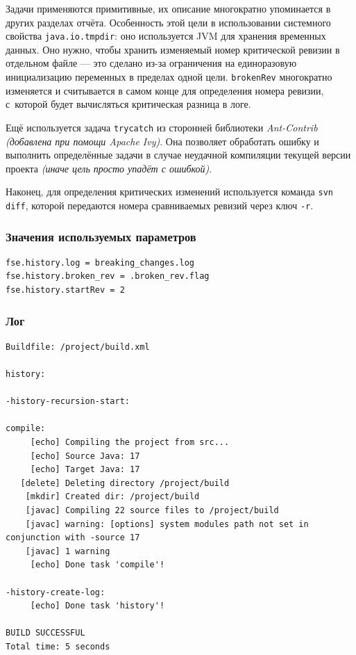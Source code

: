 Задачи применяются примитивные, их описание многократно упоминается в других разделах отчёта. Особенность этой цели в использовании системного свойства \texttt{java.io.tmpdir}: оно используется JVM для хранения временных данных. Оно нужно, чтобы хранить изменяемый номер критической ревизии в отдельном файле --- это сделано из-за ограничения на единоразовую инициализацию переменных в пределах одной цели. \texttt{brokenRev} многократно изменяется и считывается в самом конце для определения номера ревизии, с~которой будет вычисляться критическая разница в логе.

Ещё используется задача \texttt{trycatch} из сторонней библиотеки \textit{Ant-Contrib} \textit{(добавлена при помощи Apache Ivy)}. Она позволяет обработать ошибку и выполнить определённые задачи в случае неудачной компиляции текущей версии проекта \textit{(иначе цель просто упадёт с ошибкой)}.

Наконец, для определения критических изменений используется команда \texttt{svn diff}, которой передаются номера сравниваемых ревизий через ключ \texttt{-r}.

\subsubsection{Значения используемых параметров}

\begin{lstlisting}[language=Properties,caption={Часть содержимого файла \texttt{build.properties}},captionpos=b]
fse.history.log = breaking_changes.log
fse.history.broken_rev = .broken_rev.flag
fse.history.startRev = 2
\end{lstlisting}

\subsubsection{Лог}

\begin{lstlisting}[caption={Лог цели \texttt{history} --- нет ошибок},language={},captionpos=b]
Buildfile: /project/build.xml

history:

-history-recursion-start:

compile:
     [echo] Compiling the project from src...
     [echo] Source Java: 17
     [echo] Target Java: 17
   [delete] Deleting directory /project/build
    [mkdir] Created dir: /project/build
    [javac] Compiling 22 source files to /project/build
    [javac] warning: [options] system modules path not set in conjunction with -source 17
    [javac] 1 warning
     [echo] Done task 'compile'!

-history-create-log:
     [echo] Done task 'history'!

BUILD SUCCESSFUL
Total time: 5 seconds
\end{lstlisting}

